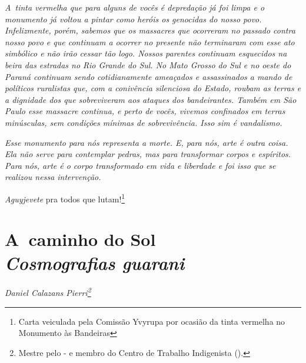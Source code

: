 \begin{samepage}
\emph{A~tinta vermelha que para alguns de vocês é depredação já foi limpa e o
monumento já voltou a pintar como heróis os genocidas do nosso povo.
Infelizmente, porém, sabemos que os massacres que ocorreram no passado
contra nosso povo e que continuam a ocorrer no presente não terminaram
com esse ato simbólico e não irão cessar tão logo. Nossos parentes
continuam esquecidos na beira das estradas no Rio Grande do Sul. No
Mato Grosso do Sul e no oeste do Paraná continuam sendo cotidianamente
ameaçados e assassinados a mando de políticos ruralistas que, com
a conivência silenciosa do Estado, roubam as terras e a dignidade dos
que sobreviveram aos ataques dos bandeirantes. Também em São Paulo esse
massacre continua, e perto de vocês, vivemos confinados em terras
minúsculas, sem condições mínimas de sobrevivência. Isso sim é
vandalismo.}

\emph{Esse monumento para nós representa a morte. E,
para nós, arte é outra coisa. Ela não serve para contemplar pedras,
mas para transformar corpos e espíritos. Para nós, arte é o corpo
transformado em vida e liberdade e foi isso que se realizou nessa
intervenção.}

\emph{Aguyjevete} pra todos que lutam!\footnote[*]{Carta veiculada pela Comissão Yvyrupa por ocasião da tinta
vermelha no Monumento às Bandeiras}
\end{samepage}


\chapter*{A~caminho do Sol\\
\large{\emph{Cosmografias guarani}}}


\begin{flushright}
\emph{Daniel Calazans Pierri\footnote{Mestre pelo - e membro do
Centro de Trabalho Indigenista ().}}
\end{flushright}
\bigskip

